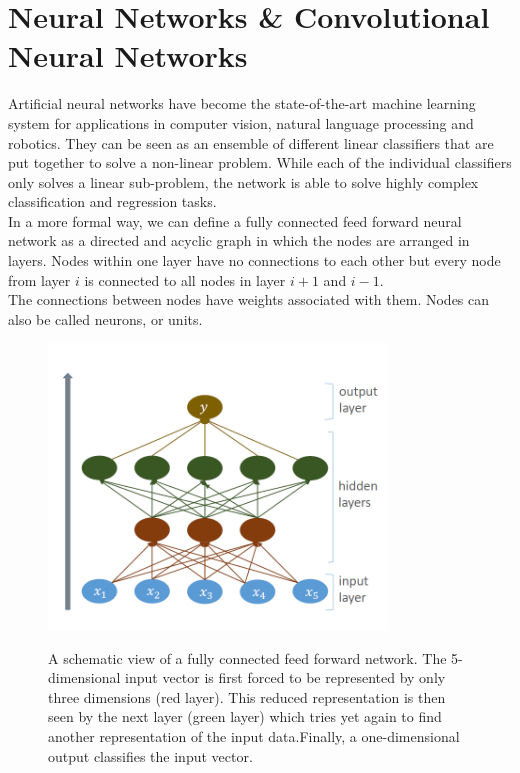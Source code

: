 \documentclass[11pt,a4paper]{article}
\begin{document}
\section{Neural Networks \& Convolutional Neural Networks}
Artificial neural networks have become the state-of-the-art machine learning system for applications in computer vision, natural language processing and robotics.\cite{visionANN, nlpANN, roboticsANN} They can be seen as an ensemble of different linear classifiers that are put together to solve a non-linear problem. While each of the individual classifiers only solves a linear sub-problem, the network is able to solve highly complex classification and regression tasks.\\
In a more formal way, we can define a fully connected feed forward neural network as a directed and acyclic graph in which the nodes are arranged in layers. Nodes within one layer have no connections to each other but every node from layer $i$ is connected to all nodes in layer $i+1$ and $i-1$.\\
The connections between nodes have weights associated with them. Nodes can also be called neurons, or units.
\begin{figure}[h!]
	\includegraphics[width=0.8\textwidth]{ann_forward.png}
	\centering
	\label{fig:ann}
	\caption[Artificial Neural Network]{A schematic view of a fully connected feed forward network. The 5-dimensional input vector is first forced to be represented by only three dimensions (red layer). This reduced representation is then seen by the next layer (green layer) which tries yet again to find another representation of the input data.Finally, a one-dimensional output classifies the input vector.}
\end{figure}
\end{document}
